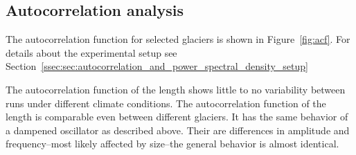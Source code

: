 


    \subsection{Autocorrelation analysis} %
    \label{sec:autocorrelation_results}

      The autocorrelation function for selected glaciers is shown in Figure~\ref{fig:acf}. For details about the experimental setup see Section~\ref{ssec:sec:autocorrelation_and_power_spectral_density_setup}

      The autocorrelation function of the \vas{} length shows little to no variability between runs under different climate conditions. %
      The autocorrelation function of the \vas{} length is comparable even between different glaciers. It has the same behavior of a dampened oscillator as described above. Their are differences in amplitude and frequency--most likely affected by size--the general behavior is almost identical. 
      
